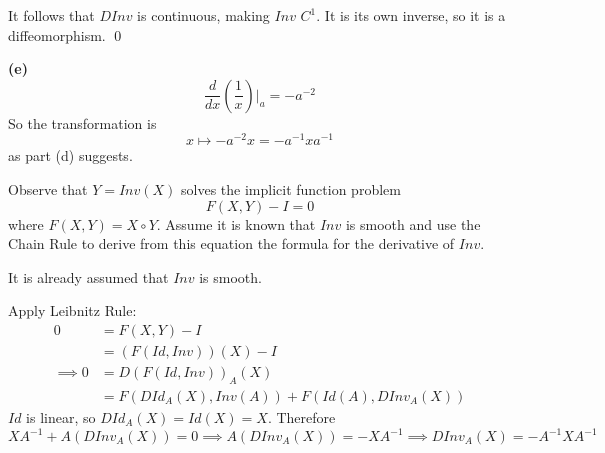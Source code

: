 \documentclass[a4paper, 12pt]{article}
\begin{document}
\begin{solution}
    It follows that $DInv$ is continuous, making $Inv$ $C^1$. It is its own inverse, so it is a diffeomorphism. \qed

    \textbf{(e)}
    \[
        \frac{d}{dx}\left(\frac{1}{x}\right)\bigg|_a = -a^{-2}
    \]
    So the transformation is \[
        x \mapsto -a^{-2}x = -a^{-1} x a^{-1}
    \]
    as part (d) suggests.
\end{solution}

\begin{problem} 
Observe that $Y = Inv (X)$ solves the implicit function problem \[
    F(X, Y) - I = 0
\]
where $F(X, Y) = X \circ Y$. Assume it is known that $Inv$ is smooth and use the Chain Rule to derive from this equation the formula for the derivative of $Inv$.
\end{problem}
\begin{solution}
    It is already assumed that $Inv$ is smooth.

    Apply Leibnitz Rule:
    \begin{align*}
        0          & = F(X, Y) - I                               \\
                   & = (F (Id, Inv))(X) - I                \\
        \implies 0 & = D(F(Id, Inv))_{A}(X)                      \\
                   & = F(DId_A(X), Inv(A)) + F(Id(A), DInv_A(X))
    \end{align*}
    $Id$ is linear, so $DId_A(X) = Id(X) = X$. Therefore \[
        X A^{-1} + A (DInv_A(X)) = 0 \implies A (DInv_A(X)) = - X A^{-1} \implies DInv_A(X) = -A^{-1} X A^{-1}
    \]
\end{solution}
\end{document}
